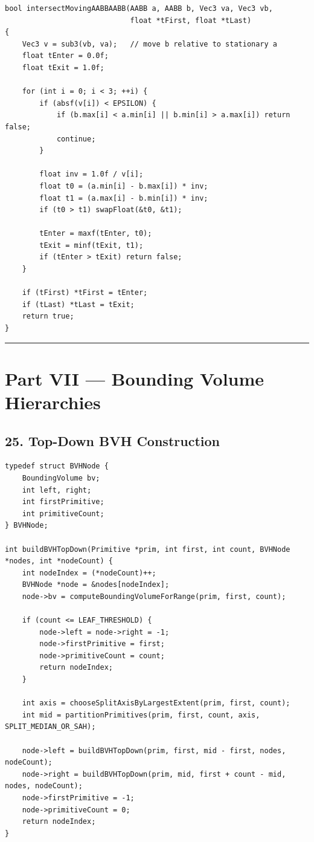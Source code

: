 \documentclass[10pt,letterpaper]{article}
\begin{document}
\begin{verbatim}
bool intersectMovingAABBAABB(AABB a, AABB b, Vec3 va, Vec3 vb,
                             float *tFirst, float *tLast)
{
    Vec3 v = sub3(vb, va);   // move b relative to stationary a
    float tEnter = 0.0f;
    float tExit = 1.0f;

    for (int i = 0; i < 3; ++i) {
        if (absf(v[i]) < EPSILON) {
            if (b.max[i] < a.min[i] || b.min[i] > a.max[i]) return false;
            continue;
        }

        float inv = 1.0f / v[i];
        float t0 = (a.min[i] - b.max[i]) * inv;
        float t1 = (a.max[i] - b.min[i]) * inv;
        if (t0 > t1) swapFloat(&t0, &t1);

        tEnter = maxf(tEnter, t0);
        tExit = minf(tExit, t1);
        if (tEnter > tExit) return false;
    }

    if (tFirst) *tFirst = tEnter;
    if (tLast) *tLast = tExit;
    return true;
}
\end{verbatim}

\medskip\hrule\medskip


\clearpage
{}
\section*{Part VII --- Bounding Volume Hierarchies}


\subsection*{25. Top-Down BVH Construction}

\begin{verbatim}
typedef struct BVHNode {
    BoundingVolume bv;
    int left, right;
    int firstPrimitive;
    int primitiveCount;
} BVHNode;

int buildBVHTopDown(Primitive *prim, int first, int count, BVHNode *nodes, int *nodeCount) {
    int nodeIndex = (*nodeCount)++;
    BVHNode *node = &nodes[nodeIndex];
    node->bv = computeBoundingVolumeForRange(prim, first, count);

    if (count <= LEAF_THRESHOLD) {
        node->left = node->right = -1;
        node->firstPrimitive = first;
        node->primitiveCount = count;
        return nodeIndex;
    }

    int axis = chooseSplitAxisByLargestExtent(prim, first, count);
    int mid = partitionPrimitives(prim, first, count, axis, SPLIT_MEDIAN_OR_SAH);

    node->left = buildBVHTopDown(prim, first, mid - first, nodes, nodeCount);
    node->right = buildBVHTopDown(prim, mid, first + count - mid, nodes, nodeCount);
    node->firstPrimitive = -1;
    node->primitiveCount = 0;
    return nodeIndex;
}
\end{verbatim}
\end{document}
